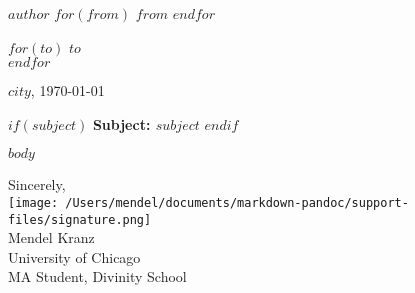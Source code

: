 \documentclass[10pt, a4paper]{article}
\begin{document}
\small
\textsc{\textbf{$author$}}
$for(from)$
\textbullet{} \textsc{$from$}
$endfor$

\vspace{1em}

\normalsize \sffamily
$for(to)$
$to$\\
$endfor$

\vspace{3em}

\rmfamily
\begin{flushright}
  $city$, \today
\end{flushright}

\vspace{1em}

$if(subject)$
\textbf{Subject: $subject$}
$endif$

\vspace{1em}

$body$

\vspace{1em}

Sincerely,\\\texttt{[image: /Users/mendel/documents/markdown-pandoc/support-files/signature.png]}\\Mendel Kranz\\University of Chicago\\MA Student, Divinity School
\end{document}
